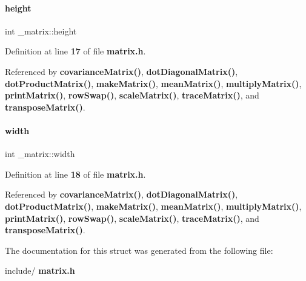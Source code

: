 \mbox{\label{struct__matrix_a8d3b2dbcf98704f11073d646273eb3b0}} 
\paragraph{height}
{\footnotesize\ttfamily int \+\_\+matrix\+::height}



Definition at line \textbf{ 17} of file \textbf{ matrix.\+h}.



Referenced by \textbf{ covariance\+Matrix()}, \textbf{ dot\+Diagonal\+Matrix()}, \textbf{ dot\+Product\+Matrix()}, \textbf{ make\+Matrix()}, \textbf{ mean\+Matrix()}, \textbf{ multiply\+Matrix()}, \textbf{ print\+Matrix()}, \textbf{ row\+Swap()}, \textbf{ scale\+Matrix()}, \textbf{ trace\+Matrix()}, and \textbf{ transpose\+Matrix()}.

\mbox{\label{struct__matrix_a30d055d00e1b4afea4568f2aa1cf5c37}} 
\paragraph{width}
{\footnotesize\ttfamily int \+\_\+matrix\+::width}



Definition at line \textbf{ 18} of file \textbf{ matrix.\+h}.



Referenced by \textbf{ covariance\+Matrix()}, \textbf{ dot\+Diagonal\+Matrix()}, \textbf{ dot\+Product\+Matrix()}, \textbf{ make\+Matrix()}, \textbf{ mean\+Matrix()}, \textbf{ multiply\+Matrix()}, \textbf{ print\+Matrix()}, \textbf{ row\+Swap()}, \textbf{ scale\+Matrix()}, \textbf{ trace\+Matrix()}, and \textbf{ transpose\+Matrix()}.



The documentation for this struct was generated from the following file\+:\begin{DoxyCompactItemize}
\item 
include/\textbf{ matrix.\+h}\end{DoxyCompactItemize}
